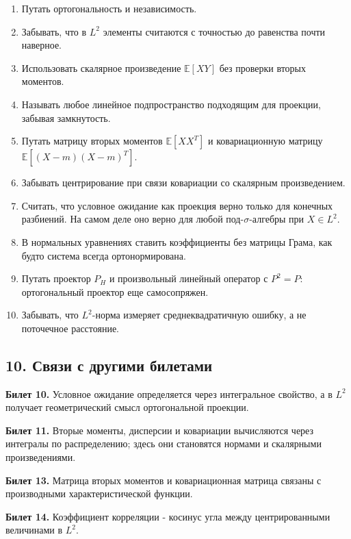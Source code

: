 \documentclass[
  11pt,
  a4paper,
]{article}
\providecommand{\tightlist}{%
  \setlength{\itemsep}{0pt}\setlength{\parskip}{0pt}}
\begin{document}
\begin{enumerate}
\def\labelenumi{\arabic{enumi}.}
\tightlist
\item
  Путать ортогональность и независимость.
\item
  Забывать, что в \(L^2\) элементы считаются с точностью до равенства
  почти наверное.
\item
  Использовать скалярное произведение \(\mathbb E[XY]\) без проверки
  вторых моментов.
\item
  Называть любое линейное подпространство подходящим для проекции,
  забывая замкнутость.
\item
  Путать матрицу вторых моментов \(\mathbb E[XX^T]\) и ковариационную
  матрицу \(\mathbb E[(X-m)(X-m)^T]\).
\item
  Забывать центрирование при связи ковариации со скалярным
  произведением.
\item
  Считать, что условное ожидание как проекция верно только для конечных
  разбиений. На самом деле оно верно для любой под-\(\sigma\)-алгебры
  при \(X\in L^2\).
\item
  В нормальных уравнениях ставить коэффициенты без матрицы Грама, как
  будто система всегда ортонормирована.
\item
  Путать проектор \(P_H\) и произвольный линейный оператор с \(P^2=P\):
  ортогональный проектор еще самосопряжен.
\item
  Забывать, что \(L^2\)-норма измеряет среднеквадратичную ошибку, а не
  поточечное расстояние.
\end{enumerate}

\subsection{10. Связи с другими
билетами}\label{ux441ux432ux44fux437ux438-ux441-ux434ux440ux443ux433ux438ux43cux438-ux431ux438ux43bux435ux442ux430ux43cux438}

\textbf{Билет 10.} Условное ожидание определяется через интегральное
свойство, а в \(L^2\) получает геометрический смысл ортогональной
проекции.

\textbf{Билет 11.} Вторые моменты, дисперсии и ковариации вычисляются
через интегралы по распределению; здесь они становятся нормами и
скалярными произведениями.

\textbf{Билет 13.} Матрица вторых моментов и ковариационная матрица
связаны с производными характеристической функции.

\textbf{Билет 14.} Коэффициент корреляции - косинус угла между
центрированными величинами в \(L^2\).
\end{document}
